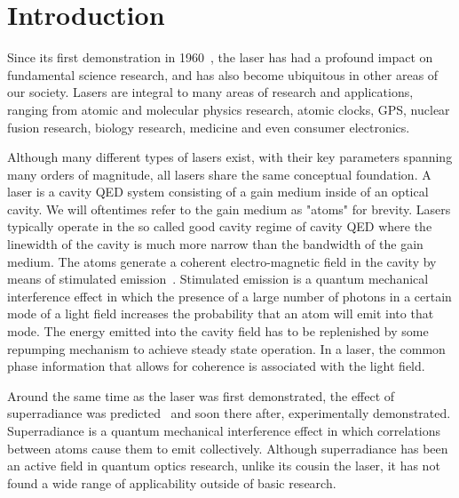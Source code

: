 \documentclass[aps,prl,twocolumn,
superscriptaddress,groupedaddress]{revtex4}
\begin{document}
\maketitle

\section{Introduction}
Since its first demonstration in 1960~\cite{maiman1960stimulated}, the
laser has had a profound impact on fundamental science research, and has
also become ubiquitous in other areas of our society. Lasers are
integral to many areas of research and applications, ranging from atomic
and molecular physics research, atomic clocks, GPS, nuclear fusion
research, biology research, medicine and even consumer electronics.

Although many different types of lasers exist, with their key parameters
spanning many orders of magnitude, all lasers share the same conceptual
foundation.  A laser is a cavity QED system consisting of a gain medium
inside of an optical cavity.  We will oftentimes refer to the gain
medium as "atoms" for brevity.  Lasers typically operate in the so
called good cavity regime of cavity QED where the linewidth of the
cavity is much more narrow than the bandwidth of the gain medium.  The
atoms generate a coherent electro-magnetic field in the cavity by means
of stimulated emission~\cite{PhysRev.112.1940}. Stimulated emission is a
quantum mechanical interference effect in which the presence of a large
number of photons in a certain mode of a light field increases the
probability that an atom will emit into that mode. The energy emitted
into the cavity field has to be replenished by some repumping mechanism
to achieve steady state operation. In a laser, the common phase
information that allows for coherence is associated with the light
field.

Around the same time as the laser was first demonstrated, the effect of
superradiance was predicted~\cite{PhysRev.93.99} and soon there after,
experimentally demonstrated.  Superradiance is a quantum mechanical
interference effect in which correlations between atoms cause them to
emit collectively.  Although superradiance has been an active field in
quantum optics research, unlike its cousin the laser, it has not found a
wide range of applicability outside of basic research.
\end{document}

